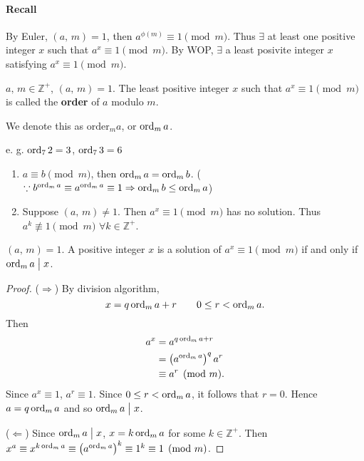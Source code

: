 \paragraph{Recall}

By Euler, $\left(a,\,m\right)=1$, then $a^{\phi\left(m\right)} \equiv 1\pmod{m}$.
Thus $\exists$ at least one positive integer $x$ such that $a^x \equiv 1\pmod{m}$.
By WOP, $\exists$ a least posivite integer $x$ satisfying $a^x \equiv 1\pmod{m}$.

\begin{definition}
    $a,\,m \in \mathbb{Z}^+$, $\left(a,\,m\right)=1$.
    The least positive integer $x$ such that $a^x \equiv 1\pmod{m}$ is called
    the \textbf{order} of $a$ modulo $m$.

    We denote this as $\mathrm{order}_m a$, or $\operatorname{\mathrm{ord}}_m a$.
\end{definition}
e. g. $\operatorname{\mathrm{ord}}_7 2 = 3$, $\operatorname{\mathrm{ord}}_7 3 = 6$

\begin{remark}
    \begin{enumerate}
        \item $a \equiv b\pmod{m}$, then $\operatorname{\mathrm{ord}}_m a = \operatorname{\mathrm{ord}}_m b$. ($\because b^{\operatorname{\mathrm{ord}}_m a} \equiv a^{\operatorname{\mathrm{ord}}_m a} \equiv 1 \Rightarrow \operatorname{\mathrm{ord}}_m b\leq \operatorname{\mathrm{ord}}_m a$)
        \item Suppose $\left(a,\,m\right) \neq 1$. Then $a^x \equiv 1\pmod{m}$ has no solution.
        Thus $a^k \not\equiv 1\pmod{m}$ $\forall k \in \mathbb{Z}^+$.
    \end{enumerate}
\end{remark}

\begin{theorem}
    $\left(a,\,m\right)=1$. A positive integer $x$ is a solution
    of $a^x \equiv 1\pmod{m}$ if and only if $\operatorname{\mathrm{ord}}_m a \bigm| x$. 
\end{theorem}
\begin{proof}
    ($\Rightarrow$) By division algorithm,
    \[
        x = q \operatorname{\mathrm{ord}}_m a + r \qquad 0 \leq r < \operatorname{\mathrm{ord}}_m a.    
    \]
    Then
    \begin{align*}
        a^x &= a^{q \operatorname{\mathrm{ord}}_m a + r} \\
        &= \left(a^{\operatorname{\mathrm{ord}}_m a}\right)^q a^r \\
        &\equiv a^r \pmod{m}.
    \end{align*}
    Since $a^x \equiv 1$, $a^r \equiv 1$.
    Since $0 \leq r < \operatorname{\mathrm{ord}}_m a$, it follows that $r=0$.
    Hence $a=q \operatorname{\mathrm{ord}}_m a$ and so $\operatorname{\mathrm{ord}}_m a \bigm| x$. 

    ($\Leftarrow$) Since $\operatorname{\mathrm{ord}}_m a \bigm| x$, $x=k \operatorname{\mathrm{ord}}_m a$ for some $k \in \mathbb{Z}^+$.
    Then $x^a \equiv x^{k \operatorname{\mathrm{ord}}_m a} \equiv \left(a^{\operatorname{\mathrm{ord}}_m a}\right)^k \equiv 1^k \equiv 1\pmod{m}$.
\end{proof}

